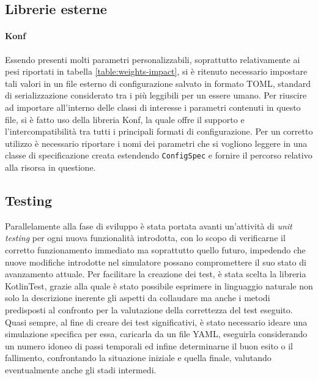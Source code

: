 \subsection{Librerie esterne}

\paragraph{Konf}
Essendo presenti molti parametri personalizzabili, soprattutto relativamente ai pesi riportati in tabella \ref{table:weights-impact}, si è ritenuto necessario impostare tali valori in un file esterno di configurazione salvato in formato TOML, standard di serializzazione considerato tra i più leggibili per un essere umano. \newline
Per riuscire ad importare all'interno delle classi di interesse i parametri contenuti in questo file, si è fatto uso della libreria Konf, la quale offre il supporto e l'intercompatibilità tra tutti i principali formati di configurazione.
Per un corretto utilizzo è necessario riportare i nomi dei parametri che si vogliono leggere in una classe di specificazione creata estendendo \texttt{ConfigSpec} e fornire il percorso relativo alla risorsa in questione.

\subsection{Testing}
Parallelamente alla fase di sviluppo è stata portata avanti un'attività di \textit{unit testing} per ogni nuova funzionalità introdotta, con lo scopo di verificarne il corretto funzionamento immediato ma soprattutto quello futuro, impedendo che nuove modifiche introdotte nel simulatore possano compromettere il suo stato di avanzamento attuale. \newline
Per facilitare la creazione dei test, è stata scelta la libreria KotlinTest, grazie alla quale è stato possibile esprimere in linguaggio naturale non solo la descrizione inerente gli aspetti da collaudare ma anche i metodi predisposti al confronto per la valutazione della correttezza del test eseguito. \newline
Quasi sempre, al fine di creare dei test significativi, è stato necessario ideare una simulazione specifica per essa, caricarla da un file YAML, eseguirla considerando un numero idoneo di passi temporali ed infine determinarne il buon esito o il fallimento, confrontando la situazione iniziale e quella finale, valutando eventualmente anche gli stadi intermedi.